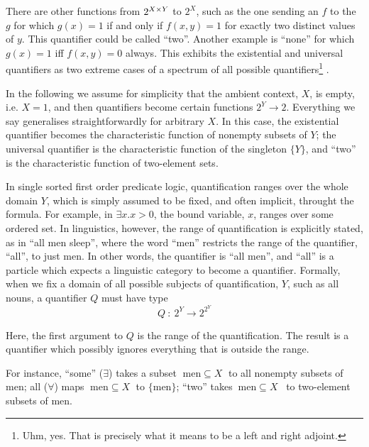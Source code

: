 There are other functions from $2^{X\times Y}$ to $2^X$,
such as the one sending an $f$ to the $g$ for which
$g(x) = 1$ if and only if $f(x,y) = 1$ for exactly two distinct values
of $y$. This quantifier could be called ``two''. Another example is
``none'' for which $g(x)=1$ iff $f(x,y) = 0$ always. This exhibits the 
existential and universal quantifiers as two extreme cases of a
spectrum of all possible quantifiers\footnote{Uhm, yes. That is
  precisely what it means to be a left and right adjoint.}  .  

In the following we assume for simplicity that the ambient context,
$X$, is empty, i.e. $X = 1$, and then quantifiers become certain
functions $2^Y \to 2$. Everything we say generalises
straightforwardly for arbitrary $X$.  In this case, the existential quantifier
becomes the characteristic function of nonempty subsets of $Y$; the
universal quantifier is the characteristic function of the singleton
$\{Y\}$, and ``two'' is the characteristic function of two-element sets.

In single sorted first order predicate logic, quantification ranges
over the whole domain $Y$, which is simply assumed to be fixed, and
often implicit, throught the formula. For example, in $\exists x. x >
0$, the bound variable, $x$, ranges over some ordered set. In
linguistics, however, the range of quantification is explicitly
stated, as in ``all men sleep'', where the word ``men'' restricts the
range of the quantifier, ``all'', to just men. In other words, the
quantifier is ``all men'', and ``all'' is a particle which expects a
linguistic category to become a quantifier. Formally, when we fix a
domain of all possible subjects of quantification, $Y$, such as all
nouns, a quantifier $Q$ must have type
\begin{equation}\label{eq:q}
Q ~: ~2^Y \to 2^{2^Y}
\end{equation}

Here, the first argument to $Q$ is the range of the quantification. The
result is a quantifier which possibly ignores everything that is
outside the range.

For instance, ``some'' ($\exists$) takes a subset
$\;\mathrm{men}\subseteq X\;$ to all nonempty subsets of $\mathrm{men}$; all
($\forall$) maps $\;\mathrm{men}\subseteq X\;$ to $ \{ \mathrm{men}
\}$; ``two'' takes $~\mathrm{men} \subseteq X$~ to two-element subsets of
$\mathrm{men}$.

